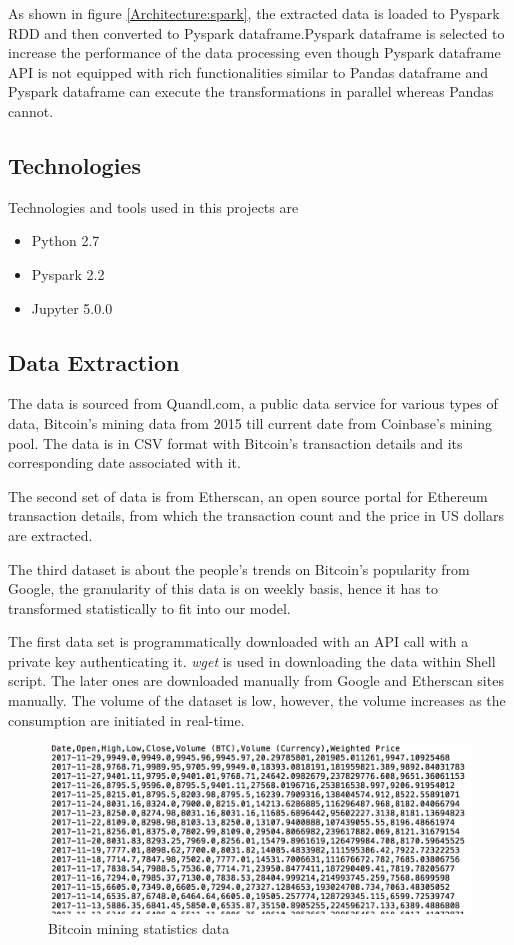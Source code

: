 \documentclass[sigconf]{acmart}
\begin{document}
As shown in figure \ref{Architecture:spark}, the extracted data is loaded to Pyspark RDD and then converted to Pyspark dataframe.Pyspark dataframe is selected to increase the performance of the data processing even though Pyspark dataframe API is not equipped with rich functionalities similar to Pandas dataframe and Pyspark dataframe can execute the transformations in parallel whereas Pandas cannot. 

\subsection{Technologies}
Technologies and tools used in this projects are
\begin{itemize}
\item Python 2.7 
\item Pyspark 2.2
\item Jupyter 5.0.0
\end{itemize}


\subsection{Data Extraction}
The data is sourced from Quandl.com, a public data service for various types of data, Bitcoin's mining data from 2015 till current date from Coinbase's mining pool. The data is in CSV format with Bitcoin's transaction details and its corresponding date associated with it.

The second set of data is from Etherscan, an open source portal for Ethereum transaction details, from which the transaction count and the price in US dollars are extracted.

The third dataset is about the people's trends on Bitcoin's popularity from Google, the granularity of this data is on weekly basis, hence it has to transformed statistically to fit into our model.

The first data set is programmatically downloaded with an API call with a private key authenticating it. {\em wget } is used in downloading the data within Shell script.
The later ones are downloaded manually from Google and Etherscan sites manually. The volume of the dataset is low, however, the volume increases as the consumption are initiated in real-time.

\begin{figure}[!ht]
  \centering\includegraphics[width=\columnwidth]{images/Source1data.png}
  \caption{Bitcoin mining statistics data}
  \label{}
\end{figure}
\end{document}

